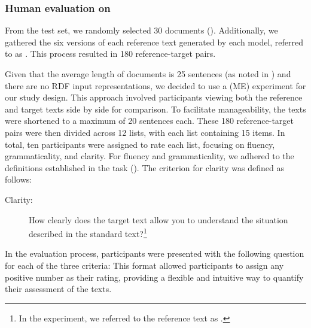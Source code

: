 


\subsubsection{Human evaluation on \wsj}


From the \wsj test set, we randomly selected 30 documents (). Additionally, we gathered the six versions of each reference text generated by each \wsj model, referred to as . This process resulted in 180 reference-target pairs.


Given that the average length of \wsj documents is 25 sentences (as noted in ) and there are no RDF input representations, we decided to use a   (ME) experiment \citep{bard1996magnitude} for our study design. This approach involved participants viewing both the reference and target texts side by side for comparison. To facilitate manageability, the texts were shortened to a maximum of 20 sentences each. These 180 reference-target pairs were then divided across 12 lists, with each list containing 15 items. In total, ten participants were assigned to rate each list, focusing on fluency, grammaticality, and clarity. For fluency and grammaticality, we adhered to the definitions established in the \webnlg task (). The criterion for clarity was defined as follows:

\begin{description}
	\item[{Clarity:}] How clearly does the target text allow you to understand the situation described in the standard text?\footnote{In the experiment, we referred to the reference text as .}
\end{description}

In the evaluation process, participants were presented with the following question for each of the three criteria:  This format allowed participants to assign any positive number as their rating, providing a flexible and intuitive way to quantify their assessment of the texts.



